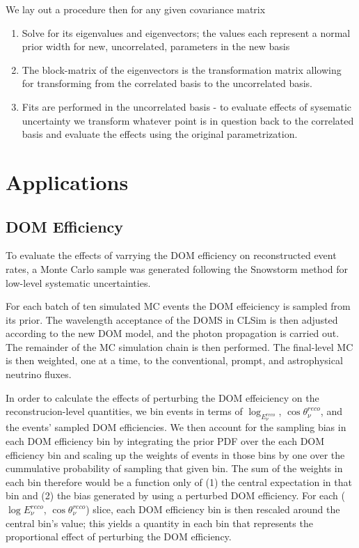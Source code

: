 \documentclass[main.tex]{subfiles}
\begin{document}
We lay out a procedure then for any given covariance matrix
\begin{enumerate}
    \item Solve for its eigenvalues and eigenvectors; the values each represent a normal prior width for new, uncorrelated, parameters in the new basis
    \item The block-matrix of the eigenvectors is the transformation matrix allowing for transforming from the correlated basis to the uncorrelated basis. 
    \item Fits are performed in the uncorrelated basis - to evaluate effects of sysematic uncertainty we transform whatever point is in question back to the correlated basis and evaluate the effects using the original parametrization. 
\end{enumerate}

\section{Applications}
\subsection{DOM Efficiency}\label{subsect:domeff}

To evaluate the effects of varrying the DOM efficiency on reconstructed event rates, a Monte Carlo sample was generated following the Snowstorm method for low-level systematic uncertainties.

For each batch of ten simulated MC events the DOM effeiciency is sampled from its prior. 
The wavelength acceptance of the DOMS in CLSim is then adjusted according to the new DOM model, and the photon propagation is carried out. 
The remainder of the MC simulation chain is then performed.
The final-level MC is then weighted, one at a time, to the conventional, prompt, and astrophysical neutrino fluxes. 

In order to calculate the effects of perturbing the DOM effeiciency on the reconstrucion-level quantities, we bin events in terms of $\log_{E_{\nu}^{reco}}$, $\cos\theta_{\nu}^{reco}$, and the events' sampled DOM efficiencies. 
We then account for the sampling bias in each DOM efficiency bin by integrating the prior PDF over the each DOM efficiency bin and scaling up the weights of events in those bins by one over the cummulative probability of sampling that given bin. 
The sum of the weights in each bin therefore would be a function only of (1) the central expectation in that bin and (2) the bias generated by using a perturbed DOM efficiency. 
For each ($\log E_{\nu}^{reco}$, $\cos\theta_{\nu}^{reco}$) slice, each DOM efficiency bin is then rescaled around the central bin's value; this yields a quantity in each bin that represents the proportional effect of perturbing the DOM efficiency. 
\end{document}
